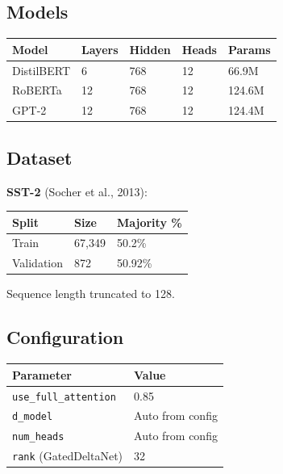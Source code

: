 \subsection{Models}

\begin{table}[H]
\centering
\small
\begin{tabular}{lllll}
\toprule
\textbf{Model} & \textbf{Layers} & \textbf{Hidden} & \textbf{Heads} & \textbf{Params} \\
\midrule
DistilBERT & 6 & 768 & 12 & 66.9M \\
RoBERTa & 12 & 768 & 12 & 124.6M \\
GPT-2 & 12 & 768 & 12 & 124.4M \\
\bottomrule
\end{tabular}
\end{table}

\subsection{Dataset}

\textbf{SST-2} (Socher et al., 2013):

\begin{table}[H]
\centering
\small
\begin{tabular}{lll}
\toprule
\textbf{Split} & \textbf{Size} & \textbf{Majority \%} \\
\midrule
Train & 67,349 & 50.2\% \\
Validation & 872 & 50.92\% \\
\bottomrule
\end{tabular}
\end{table}

Sequence length truncated to 128.

\subsection{Configuration}

\begin{table}[H]
\centering
\small
\begin{tabular}{ll}
\toprule
\textbf{Parameter} & \textbf{Value} \\
\midrule
\texttt{use\_full\_attention} & 0.85 \\
\texttt{d\_model} & Auto from config \\
\texttt{num\_heads} & Auto from config \\
\texttt{rank} (GatedDeltaNet) & 32 \\
\bottomrule
\end{tabular}
\end{table}

